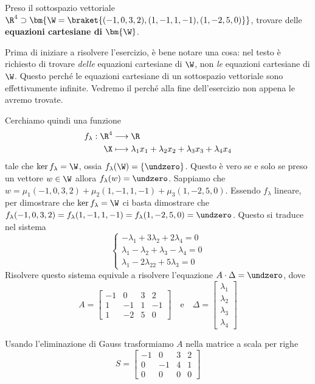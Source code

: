 \documentclass[11pt, a4paper, titlepage, oneside]{scrbook}
\begin{document}
\Esempio \nopagebreak

Preso il sottospazio vettoriale $\R^4 \supset \bm{\W = \braket{(-1,0,3,2),(1,-1,1,-1),(1,-2,5,0)}}$, trovare delle \textbf{equazioni cartesiane di} $\bm{\W}$. \nopagebreak

Prima di iniziare a risolvere l'esercizio, è bene notare una cosa: nel testo è richiesto di trovare \textit{delle} equazioni cartesiane di $\W$, non \textit{le} equazioni cartesiane di $\W$. Questo perché le equazioni cartesiane di un sottospazio vettoriale sono effettivamente infinite. Vedremo il perché alla fine dell'esercizio non appena le avremo trovate.

Cerchiamo quindi una funzione
\begin{align*}
f_\lambda: \R^4 &\longrightarrow \R \\
\X &\longmapsto \lambda_1 x_1 + \lambda_2 x_2 + \lambda_3 x_3 + \lambda_4 x_4
\end{align*}
tale che $\ker f_\lambda = \W$, ossia $f_\lambda (\W) = \{\undzero\}$. Questo è vero se e solo se preso un vettore $w \in \W$ allora $f_\lambda(w) = \undzero$. Sappiamo che $w = \mu_1 (-1,0,3,2) + \mu_2 (1,-1,1,-1) + \mu_3 (1,-2,5,0)$. Essendo $f_\lambda$ lineare, per dimostrare che $\ker f_\lambda = \W$ ci basta dimostrare che \mbox{$f_\lambda(-1,0,3,2) = f_\lambda(1,-1,1,-1) = f_\lambda(1,-2,5,0) = \undzero$}. Questo si traduce nel sistema
\[
\begin{cases}
-\lambda_1 + 3\lambda_2 + 2\lambda_4 = 0 \\
\lambda_1 - \lambda_2 + \lambda_3 - \lambda_4 = 0 \\
\lambda_1 - 2\lambda_22 + 5\lambda_3 = 0
\end{cases}
\]
Risolvere questo sistema equivale a risolvere l'equazione $A \cdot \Delta = \undzero$, dove 
\[ A =
\begin{bmatrix}
    -1 & 0 & 3 & 2  \\
    1 & -1 & 1 & -1 \\
    1 & -2 & 5 & 0
\end{bmatrix}
\quad \text{e} \quad 
\Delta = \begin{bmatrix}
    \lambda_1 \\
    \lambda_2 \\
    \lambda_3 \\
    \lambda_4
\end{bmatrix}
\]

Usando l'eliminazione di Gauss trasformiamo $A$ nella matrice a scala per righe
\[S = 
\begin{bmatrix}
    -1 & 0 & 3 & 2 \\
    0 & -1 & 4 & 1 \\
    0 & 0 & 0 & 0
\end{bmatrix}
\]
\end{document}
